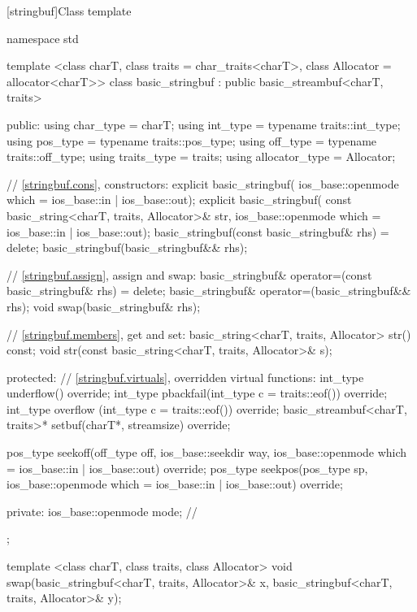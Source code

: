 [stringbuf]{Class template }
%
\begin{codeblock}
namespace std {
  template <class charT, class traits = char_traits<charT>,
            class Allocator = allocator<charT>>
  class basic_stringbuf
    : public basic_streambuf<charT, traits> {
  public:
    using char_type      = charT;
    using int_type       = typename traits::int_type;
    using pos_type       = typename traits::pos_type;
    using off_type       = typename traits::off_type;
    using traits_type    = traits;
    using allocator_type = Allocator;

    // \ref{stringbuf.cons}, constructors:
    explicit basic_stringbuf(
      ios_base::openmode which = ios_base::in | ios_base::out);
    explicit basic_stringbuf(
      const basic_string<charT, traits, Allocator>& str,
      ios_base::openmode which = ios_base::in | ios_base::out);
    basic_stringbuf(const basic_stringbuf& rhs) = delete;
    basic_stringbuf(basic_stringbuf&& rhs);

    // \ref{stringbuf.assign}, assign and swap:
    basic_stringbuf& operator=(const basic_stringbuf& rhs) = delete;
    basic_stringbuf& operator=(basic_stringbuf&& rhs);
    void swap(basic_stringbuf& rhs);

    // \ref{stringbuf.members}, get and set:
    basic_string<charT, traits, Allocator> str() const;
    void str(const basic_string<charT, traits, Allocator>& s);

  protected:
    // \ref{stringbuf.virtuals}, overridden virtual functions:
    int_type underflow() override;
    int_type pbackfail(int_type c = traits::eof()) override;
    int_type overflow (int_type c = traits::eof()) override;
    basic_streambuf<charT, traits>* setbuf(charT*, streamsize) override;

    pos_type seekoff(off_type off, ios_base::seekdir way,
                     ios_base::openmode which
                      = ios_base::in | ios_base::out) override;
    pos_type seekpos(pos_type sp,
                     ios_base::openmode which
                      = ios_base::in | ios_base::out) override;

  private:
    ios_base::openmode mode;  // \expos
  };

  template <class charT, class traits, class Allocator>
    void swap(basic_stringbuf<charT, traits, Allocator>& x,
              basic_stringbuf<charT, traits, Allocator>& y);
}
\end{codeblock}

